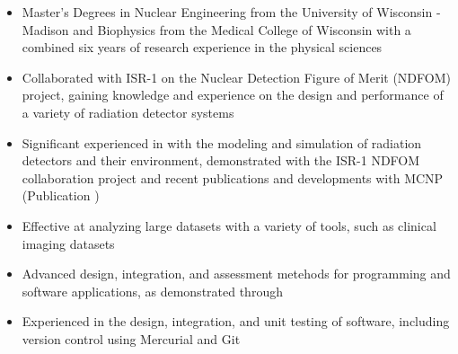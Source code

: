 \begin{center}
\begin{minipage}{0.95\textwidth}
  \begin{itemize}[leftmargin=.25in,rightmargin=.5in,itemsep=1.0mm]

	\item Master's Degrees in Nuclear Engineering from the University of Wisconsin - Madison and Biophysics from the Medical College of Wisconsin with a combined six years of research experience in the physical sciences
		
	\item Collaborated with ISR-1 on the Nuclear Detection Figure of Merit (NDFOM) project, gaining knowledge and experience on the design and performance of a variety of radiation detector systems
	
	\item Significant experienced in with the modeling and simulation of radiation detectors and their environment, demonstrated with the ISR-1 NDFOM collaboration project and recent publications and developments with \textsc{MCNP} (Publication \cite{ieee_nss_217}) 
	\item Effective at analyzing large datasets with a variety of tools, such as clinical imaging datasets 
		
	\item Advanced design, integration, and assessment metehods for programming and software applications, as demonstrated through 
	\item Experienced in the design, integration, and unit testing of software, including version control using Mercurial and Git
		

\end{itemize}
\end{minipage}
\end{center}
